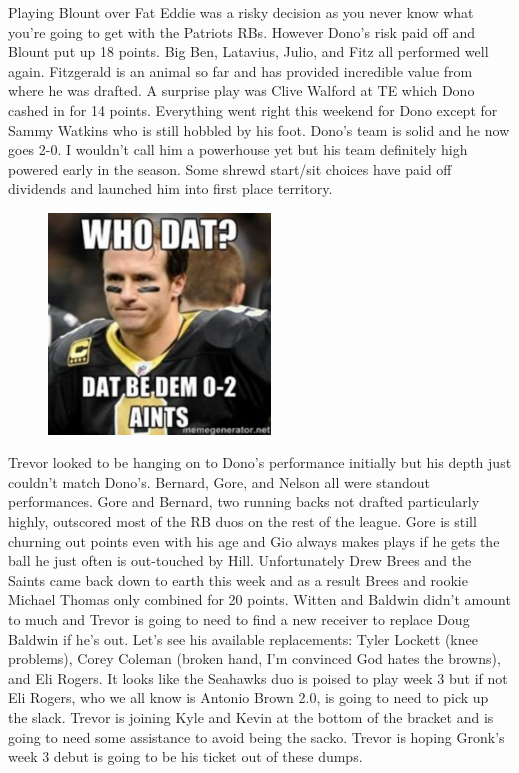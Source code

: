 \documentclass[11pt,letterpaper]{article}
\begin{document}
\newpage
{}
\par\noindent Playing Blount over Fat Eddie was a risky decision as you never know what you're going to get with the Patriots RBs. However Dono’s risk paid off and Blount put up 18 points. Big Ben, Latavius, Julio, and Fitz all performed well again. Fitzgerald is an animal so far and has provided incredible value from where he was drafted. A surprise play was Clive Walford at TE which Dono cashed in for 14 points. Everything went right this weekend for Dono except for Sammy Watkins who is still hobbled by his foot. Dono's team is solid and he now goes 2-0. I wouldn't call him a powerhouse yet but his team definitely high powered early in the season. Some shrewd start/sit choices have paid off dividends and launched him into first place territory.
\begin{figure}
\centering
\includegraphics[width=0.525\textwidth]{week2-brees.png}
\label{fig:week2-brees}
\end{figure} 
\bigskip
\par\noindent Trevor looked to be hanging on to Dono's performance initially but his depth just couldn't match Dono's. Bernard, Gore, and Nelson all were standout performances. Gore and Bernard, two running backs not drafted particularly highly, outscored most of the RB duos on the rest of the league. Gore is still churning out points even with his age and Gio always makes plays if he gets the ball he just often is out-touched by Hill. Unfortunately Drew Brees and the Saints came back down to earth this week and as a result Brees and rookie Michael Thomas only combined for 20 points. Witten and Baldwin didn't amount to much and Trevor is going to need to find a new receiver to replace Doug Baldwin if he's out. Let's see his available replacements: Tyler Lockett (knee problems), Corey Coleman (broken hand, I'm convinced God hates the browns), and Eli Rogers. It looks like the Seahawks duo is poised to play week 3 but if not Eli Rogers, who we all know is Antonio Brown 2.0, is going to need to pick up the slack. Trevor is joining Kyle and Kevin at the bottom of the bracket and is going to need some assistance to avoid being the sacko. Trevor is hoping Gronk's week 3 debut is going to be his ticket out of these dumps.
\end{document}
